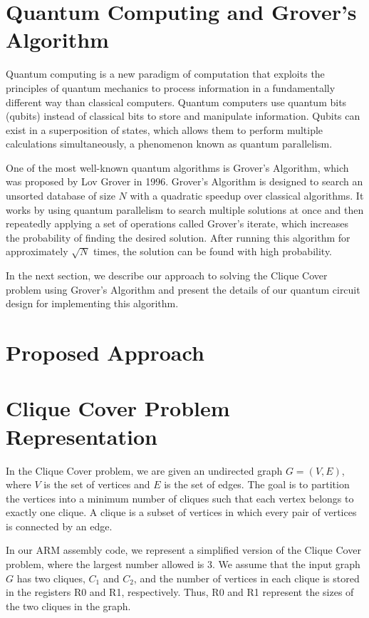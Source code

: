 \section{Quantum Computing and Grover's Algorithm}

Quantum computing is a new paradigm of computation that exploits the principles of quantum mechanics to process information in a fundamentally different way than classical computers. Quantum computers use quantum bits (qubits) instead of classical bits to store and manipulate information. Qubits can exist in a superposition of states, which allows them to perform multiple calculations simultaneously, a phenomenon known as quantum parallelism.

One of the most well-known quantum algorithms is Grover's Algorithm, which was proposed by Lov Grover in 1996. Grover's Algorithm is designed to search an unsorted database of size $N$ with a quadratic speedup over classical algorithms. It works by using quantum parallelism to search multiple solutions at once and then repeatedly applying a set of operations called Grover's iterate, which increases the probability of finding the desired solution. After running this algorithm for approximately $\sqrt{N}$ times, the solution can be found with high probability.

In the next section, we describe our approach to solving the Clique Cover problem using Grover's Algorithm and present the details of our quantum circuit design for implementing this algorithm.

\section{Proposed Approach}


\section{Clique Cover Problem Representation}

In the Clique Cover problem, we are given an undirected graph $G = (V, E)$, where $V$ is the set of vertices and $E$ is the set of edges. The goal is to partition the vertices into a minimum number of cliques such that each vertex belongs to exactly one clique. A clique is a subset of vertices in which every pair of vertices is connected by an edge.

In our ARM assembly code, we represent a simplified version of the Clique Cover problem, where the largest number allowed is 3. We assume that the input graph $G$ has two cliques, $C_1$ and $C_2$, and the number of vertices in each clique is stored in the registers R0 and R1, respectively. Thus, R0 and R1 represent the sizes of the two cliques in the graph.

